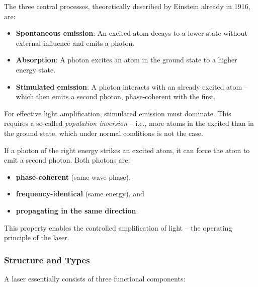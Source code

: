 \noindent
The three central processes, theoretically described by Einstein already in 1916, are:

\begin{itemize}
	\item \textbf{Spontaneous emission}: An excited atom decays to a lower state without external influence and emits a photon.
	\item \textbf{Absorption}: A photon excites an atom in the ground state to a higher energy state.
	\item \textbf{Stimulated emission}: A photon interacts with an already excited atom – which then emits a second photon, phase-coherent with the first.
\end{itemize}

For effective light amplification, stimulated emission must dominate. This requires a so-called \emph{population inversion} – i.e., more atoms in the excited than in the ground state, which under normal conditions is not the case.

\vspace{1em}
\begin{tcolorbox}[physikbox, title={Stimulated Emission as the Basis of Lasers}]
	\label{box:grundlagedeslaser}
	If a photon of the right energy strikes an excited atom, it can force the atom to emit a second photon. Both photons are:
	\begin{itemize}
		\item \textbf{phase-coherent} (same wave phase),
		\item \textbf{frequency-identical} (same energy), and
		\item \textbf{propagating in the same direction}.
	\end{itemize}
	This property enables the controlled amplification of light – the operating principle of the laser.
\end{tcolorbox}

\subsubsection{Structure and Types}

A laser essentially consists of three functional components:

